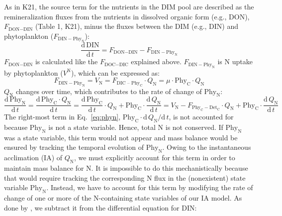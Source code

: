 \documentclass[gmd, manuscript]{copernicus}
\begin{document}
As in K21, the source term for the nutrients in the DIM pool are described as the remineralization fluxes from the nutrients in dissolved organic form (e.g., DON), $F_{\text{DON}-\text{DIN}}$ (Table 1, K21), minus the fluxes between the DIM (e.g., DIN) and phytoplankton ($F_{\text{DIN}-\text{Phy}_{\text{N}}}$):
\begin{equation} \label{eq:sdin}
  \frac{\text{d}\,\text{DIN}}{\text{d}\,t} = F_{\text{DON}-\text{DIN}} - F_{\text{DIN}-\text{Phy}_{\text{N}}}
\end{equation}
$F_{\text{DON}-\text{DIN}}$ is calculated like the $F_{\text{DOC}-\text{DIC}}$ explained above. $F_{\text{DIN}-\text{Phy}_{\text{N}}}$ is N uptake by phytoplankton ($V^{\text{N}}$), which can be expressed as:
\begin{equation} \label{eq:dphyNdt}
  F_{\text{DIN}-\text{Phy}_{\text{N}}} = V_{\text{N}} = F_{\text{DIC -- Phy}_{\text{C}}} \cdot Q_{\text{N}} = \mu \cdot \text{Phy}_{\text{C}} \cdot Q_{\text{N}}
\end{equation}
$Q_{\text{N}}$ changes over time, which contributes to the rate of change of $\text{Phy}_{\text{N}}$:
\begin{equation}
  \label{eq:phyn}
  \frac{\mathrm{d}\,\text{Phy}_{\text{N}}}{\mathrm{d}\,t} = \frac{\mathrm{d}\,\text{Phy}_{\text{C}}\cdot Q_{\text{N}}}{\mathrm{d}\,t}
  = \frac{\mathrm{d}\,\text{Phy}_{\text{C}}}{\mathrm{d}\,t} \cdot Q_{\text{N}} + \text{Phy}_{\text{C}} \cdot \frac{\mathrm{d}\,Q_{\text{N}}}{\mathrm{d}\,t}
  = V_{\text{N}} - F_{\text{Phy}_{\text{C}}-\text{Det}_{\text{C}}}\cdot Q_{\text{N}} + \text{Phy}_{\text{C}} \cdot \frac{\mathrm{d}\,Q_{\text{N}}}{\mathrm{d}\,t}
\end{equation}
The right-most term in Eq.~\eqref{eq:phyn}, $\text{Phy}_{\text{C}}\cdot \mathrm{d}\,Q_{\text{N}} / \mathrm{d}\, t$, is not accounted for because $\text{Phy}_{\text{N}}$ is not a state variable.  Hence, total N is not conserved.  If $\text{Phy}_{\text{N}}$ was a state variable, this term would not appear and mass balance would be ensured by tracking the temporal evolution of $\text{Phy}_{\text{N}}$.  Owing to the instantaneous acclimation (IA) of $Q_{\text{N}}$, we must explicitly account for this term in order to maintain mass balance for N\@.  It is impossible to do this mechanistically because that would require tracking the corresponding N flux in the (nonexistent) state variable $\text{Phy}_{\text{N}}$.  Instead, we have to account for this term by modifying the rate of change of one or more of the N-containing state variables of our IA model.  As done by \citet{Smith2016}, we subtract it from the differential equation for DIN\@:
\end{document}
